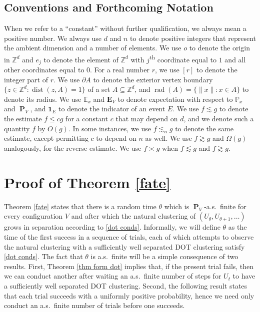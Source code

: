 \documentclass[11pt,reqno]{amsart}
\theoremstyle{definition}
\numberwithin{equation}{section}
\newcommand{\Z}{\mathbb{Z}}
\renewcommand{\P}{\mathbb{P}}
\newcommand{\E}{\mathbb{E}}
\newcommand{\1}{\mathbf{1}}
\DeclareMathOperator{\rad}{rad}
\newcommand{\bdy}{\partial}
\DeclareMathOperator{\dist}{dist}
\DeclareMathOperator{\PP}{\mathbf{P}}
\newcommand{\EE}{\mathbf{E}}
\begin{document}
\begin{figure}[omitted: a diagram of this paper's results, not reproduced here]\label{fig: logdep}\end{figure}

\subsection*{Conventions and Forthcoming Notation} When we refer to a ``constant'' without further qualification, we always mean a positive number. We always use $d$ and $n$ to denote positive integers that represent the ambient dimension and a number of elements. We use $o$ to denote the origin in $\Z^d$ and $e_j$ to denote the element of $\Z^d$ with $j$\textsuperscript{th} coordinate equal to $1$ and all other coordinates equal to $0$. For a real number $r$, we use $[r]$ to denote the integer part of $r$. We use $\bdy A$ to denote the exterior vertex boundary $\{z \in \Z^d: \dist(z,A) = 1\}$ of a set $A \subseteq \Z^d$, and $\rad (A) = \{\|x\| : x \in A\}$ to denote its radius. We use $\E_x$ and $\EE_V$ to denote expectation with respect to $\P_x$ and $\PP_V$, and $\1_E$ to denote the indicator of an event $E$. We use $f \lesssim g$ to denote the estimate $f \leq c g$ for a constant $c$ that may depend on $d$, and we denote such a quantity $f$ by $O(g)$. In some instances, we use $f \lesssim_n g$ to denote the same estimate, except permitting $c$ to depend on $n$ as well. We use $f \gtrsim g$ and $\Omega (g)$ analogously, for the reverse estimate. We use $f \asymp g$ when $f \lesssim g$ and $f \gtrsim g$.


\section{Proof of Theorem \ref{fate}}\label{sec fate}

Theorem \ref{fate} states that there is a random time $\theta$ which is $\PP_V$-a.s.\ finite for every configuration $V$ and after which the natural clustering of $(U_\theta, U_{\theta+1}, \dots)$ grows in separation according to \eqref{dot conds}. Informally, we will define $\theta$ as the time of the first success in a sequence of trials, each of which attempts to observe the natural clustering with a sufficiently well separated DOT clustering satisfy \eqref{dot conds}. The fact that $\theta$ is a.s.\ finite will be a simple consequence of two results. First, Theorem \ref{thm form dot} implies that, if the present trial fails, then we can conduct another after waiting an a.s.\ finite number of steps for $U_t$ to have a sufficiently well separated DOT clustering. Second, the following result states that each trial succeeds with a uniformly positive probability, hence we need only conduct an a.s.\ finite number of trials before one succeeds.
\end{document}
